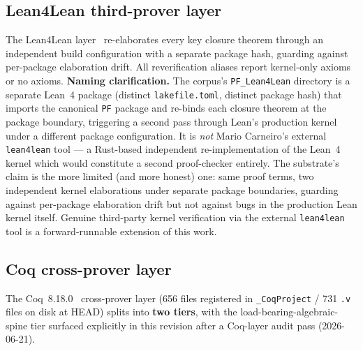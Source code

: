 \documentclass[11pt,a4paper]{amsart}
\theoremstyle{plain}
\theoremstyle{definition}
\begin{document}
\subsection{Lean4Lean third-prover layer}\label{subsec:cross-prover}

The Lean4Lean layer~\cite{carneiro2024} re-elaborates every key closure theorem through an independent build configuration with a separate package hash, guarding against per-package elaboration drift. All reverification aliases report kernel-only axioms or no axioms. \textbf{Naming clarification.} The corpus's \texttt{PF\_Lean4Lean} directory is a separate Lean~4 package (distinct \texttt{lakefile.toml}, distinct package hash) that imports the canonical \texttt{PF} package and re-binds each closure theorem at the package boundary, triggering a second pass through Lean's production kernel under a different package configuration. It is \emph{not} Mario Carneiro's external \texttt{lean4lean} tool --- a Rust-based independent re-implementation of the Lean~4 kernel which would constitute a second proof-checker entirely. The substrate's claim is the more limited (and more honest) one: same proof terms, two independent kernel elaborations under separate package boundaries, guarding against per-package elaboration drift but not against bugs in the production Lean kernel itself. Genuine third-party kernel verification via the external \texttt{lean4lean} tool is a forward-runnable extension of this work.

\subsection{Coq cross-prover layer}

The Coq~8.18.0~\cite{barras-bertot2009} cross-prover layer (656 files registered in \texttt{\_CoqProject} / 731 \texttt{.v} files on disk at HEAD) splits into \textbf{two tiers}, with the load-bearing-algebraic-spine tier surfaced explicitly in this revision after a Coq-layer audit pass (2026-06-21).
\end{document}
